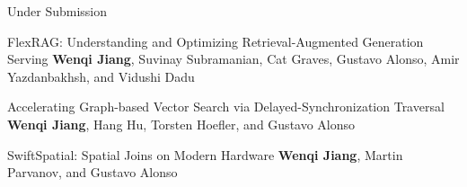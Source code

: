 

\begin{rSection}{Under Submission}
\begin{enumerate}[label={[\arabic*]}]

\item 
\begin{Pub}{FlexRAG: Understanding and Optimizing Retrieval-Augmented Generation Serving}
{\textbf{Wenqi Jiang}, Suvinay Subramanian, Cat Graves, Gustavo Alonso, Amir Yazdanbakhsh, and Vidushi Dadu}
{}
\end{Pub}

\item 
\begin{Pub}{Accelerating Graph-based Vector Search via Delayed-Synchronization Traversal}
{\textbf{Wenqi Jiang}, Hang Hu, Torsten Hoefler, and Gustavo Alonso}
{}
\end{Pub}

\item 
\begin{Pub}{SwiftSpatial: Spatial Joins on Modern Hardware}
{\textbf{Wenqi Jiang}, Martin Parvanov, and Gustavo Alonso}
{}
\end{Pub}\end{enumerate}
\end{rSection}



